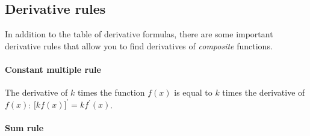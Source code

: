 		\noindent



\vspace{-4mm}	%

	\subsection{Derivative rules}

\vspace{-2mm}

		In addition to the table of derivative formulas,
		there are some important derivative rules
		that allow you to find derivatives of \emph{composite} functions.

		\paragraph{Constant multiple rule}

			The derivative of $k$ times the function $f(x)$
			is equal to $k$ times the derivative of $f(x)$:
			$\big[ k f(x) \big]^\prime		= 	k f^{\prime\!}(x)$.

		\paragraph{Sum rule}

